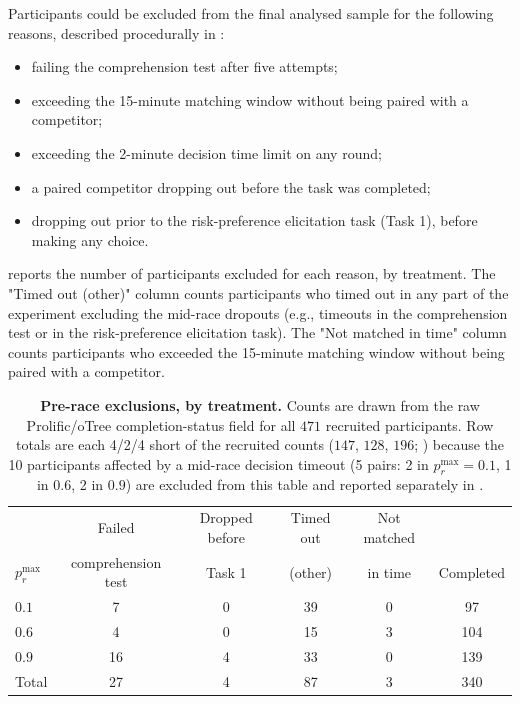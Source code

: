 \documentclass[pdflatex,sn-mathphys-ay]{sn-jnl}
\theoremstyle{thmstyleone}
\theoremstyle{thmstyletwo}
\theoremstyle{thmstylethree}
\begin{document}
Participants could be excluded from the final analysed sample for the following reasons, described procedurally in :
\begin{itemize}
    \item failing the comprehension test after five attempts;
    \item exceeding the 15-minute matching window without being paired with a competitor;
    \item exceeding the 2-minute decision time limit on any round;
    \item a paired competitor dropping out before the task was completed;
    \item dropping out prior to the risk-preference elicitation task (Task 1), before making any choice.
\end{itemize}

 reports the number of participants excluded for each reason, by treatment. The "Timed out (other)" column counts participants who timed out in any part of the experiment excluding the mid-race dropouts (e.g., timeouts in the comprehension test or in the risk-preference elicitation task). The "Not matched in time" column counts participants who exceeded the 15-minute matching window without being paired with a competitor.

\begin{table}[h]
\centering
\caption{\textbf{Pre-race exclusions, by treatment.} Counts are drawn from the raw Prolific/oTree completion-status field for all \(471\) recruited participants. Row totals are each 4/2/4 short of the recruited counts (\(147\), \(128\), \(196\); ) because the 10 participants affected by a mid-race decision timeout (5 pairs: 2 in \(p_r^{\max}=0.1\), 1 in \(0.6\), 2 in \(0.9\)) are excluded from this table and reported separately in .}
\label{tab:si:exclusions}
\begin{tabular}{lccccc}
\toprule
 & Failed & Dropped before & Timed out & Not matched & \\
\(p_r^{\max}\) & comprehension test & Task 1 & (other) & in time & Completed \\
\midrule
\(0.1\) & 7 & 0 & 39 & 0 & 97 \\
\(0.6\) & 4 & 0 & 15 & 3 & 104 \\
\(0.9\) & 16 & 4 & 33 & 0 & 139 \\
\midrule
Total & 27 & 4 & 87 & 3 & 340 \\
\bottomrule
\end{tabular}
\end{table}
\end{document}
